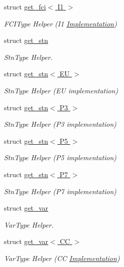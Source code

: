 \begin{DoxyCompactItemize}
struct \hyperlink{structUintah_1_1PhaseField_1_1get__fci_3_01I1_01_4}{get\+\_\+fci$<$ I1 $>$}
\begin{DoxyCompactList}\small\item\em F\+C\+I\+Type Helper (I1 \hyperlink{classUintah_1_1PhaseField_1_1Implementation}{Implementation}) \end{DoxyCompactList}\item 
struct \hyperlink{structUintah_1_1PhaseField_1_1get__stn}{get\+\_\+stn}
\begin{DoxyCompactList}\small\item\em Stn\+Type Helper. \end{DoxyCompactList}\item 
struct \hyperlink{structUintah_1_1PhaseField_1_1get__stn_3_01EU_01_4}{get\+\_\+stn$<$ E\+U $>$}
\begin{DoxyCompactList}\small\item\em Stn\+Type Helper (EU implementation) \end{DoxyCompactList}\item 
struct \hyperlink{structUintah_1_1PhaseField_1_1get__stn_3_01P3_01_4}{get\+\_\+stn$<$ P3 $>$}
\begin{DoxyCompactList}\small\item\em Stn\+Type Helper (P3 implementation) \end{DoxyCompactList}\item 
struct \hyperlink{structUintah_1_1PhaseField_1_1get__stn_3_01P5_01_4}{get\+\_\+stn$<$ P5 $>$}
\begin{DoxyCompactList}\small\item\em Stn\+Type Helper (P5 implementation) \end{DoxyCompactList}\item 
struct \hyperlink{structUintah_1_1PhaseField_1_1get__stn_3_01P7_01_4}{get\+\_\+stn$<$ P7 $>$}
\begin{DoxyCompactList}\small\item\em Stn\+Type Helper (P7 implementation) \end{DoxyCompactList}\item 
struct \hyperlink{structUintah_1_1PhaseField_1_1get__var}{get\+\_\+var}
\begin{DoxyCompactList}\small\item\em Var\+Type Helper. \end{DoxyCompactList}\item 
struct \hyperlink{structUintah_1_1PhaseField_1_1get__var_3_01CC_01_4}{get\+\_\+var$<$ C\+C $>$}
\begin{DoxyCompactList}\small\item\em Var\+Type Helper (CC \hyperlink{classUintah_1_1PhaseField_1_1Implementation}{Implementation}) \end{DoxyCompactList}\item 

\end{DoxyCompactItemize}

